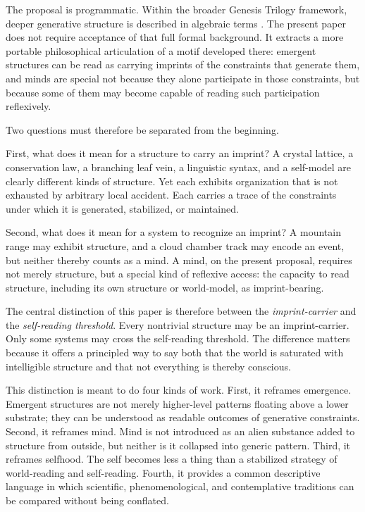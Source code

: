\documentclass[12pt]{article}
\begin{document}
The proposal is programmatic. Within the broader Genesis Trilogy framework, deeper generative structure is described in algebraic terms \cite{Liu2026HAFF_A,Liu2026HAFF_C,Liu2026HAFF_G}. The present paper does not require acceptance of that full formal background. It extracts a more portable philosophical articulation of a motif developed there: emergent structures can be read as carrying imprints of the constraints that generate them, and minds are special not because they alone participate in those constraints, but because some of them may become capable of reading such participation reflexively.

Two questions must therefore be separated from the beginning.

First, what does it mean for a structure to carry an imprint? A crystal lattice, a conservation law, a branching leaf vein, a linguistic syntax, and a self-model are clearly different kinds of structure. Yet each exhibits organization that is not exhausted by arbitrary local accident. Each carries a trace of the constraints under which it is generated, stabilized, or maintained.

Second, what does it mean for a system to recognize an imprint? A mountain range may exhibit structure, and a cloud chamber track may encode an event, but neither thereby counts as a mind. A mind, on the present proposal, requires not merely structure, but a special kind of reflexive access: the capacity to read structure, including its own structure or world-model, as imprint-bearing.

The central distinction of this paper is therefore between the \emph{imprint-carrier} and the \emph{self-reading threshold}. Every nontrivial structure may be an imprint-carrier. Only some systems may cross the self-reading threshold. The difference matters because it offers a principled way to say both that the world is saturated with intelligible structure and that not everything is thereby conscious.

This distinction is meant to do four kinds of work. First, it reframes emergence. Emergent structures are not merely higher-level patterns floating above a lower substrate; they can be understood as readable outcomes of generative constraints. Second, it reframes mind. Mind is not introduced as an alien substance added to structure from outside, but neither is it collapsed into generic pattern. Third, it reframes selfhood. The self becomes less a thing than a stabilized strategy of world-reading and self-reading. Fourth, it provides a common descriptive language in which scientific, phenomenological, and contemplative traditions can be compared without being conflated.
\end{document}
